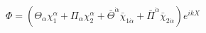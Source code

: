 \begin{equation}
  \label{massfermion4d}
  \Phi=(\Theta_\alpha \chi_{1}^\alpha + \Pi_\alpha \chi_{2}^\alpha +
  \bar\Theta^{\dot\alpha} \bar\chi_{1\dot\alpha} + \bar \Pi^{\dot\alpha}
  \bar \chi_{2\dot\alpha})e^{ikX}
\end{equation}

